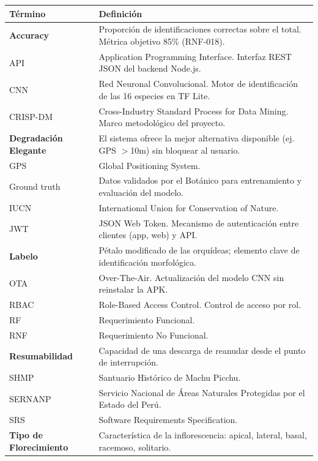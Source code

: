 \documentclass[12pt, a4paper]{article}
\begin{document}
\begin{longtable}{|p{3.2cm}|p{11.3cm}|}
\hline
\textbf{T\'ermino} & \textbf{Definici\'on} \\
\hline
\endhead
\textbf{Accuracy} & Proporci\'on de identificaciones correctas sobre el total. M\'etrica objetivo 85\% (RNF-018). \\
\hline
API & Application Programming Interface. Interfaz REST JSON del backend Node.js. \\
\hline
CNN & Red Neuronal Convolucional. Motor de identificaci\'on de las 16 especies en TF Lite. \\
\hline
CRISP-DM & Cross-Industry Standard Process for Data Mining. Marco metodol\'ogico del proyecto. \\
\hline
\textbf{Degradaci\'on Elegante} & El sistema ofrece la mejor alternativa disponible (ej. GPS $>$10m) sin bloquear al usuario. \\
\hline
GPS & Global Positioning System. \\
\hline
Ground truth & Datos validados por el Bot\'anico para entrenamiento y evaluaci\'on del modelo. \\
\hline
IUCN & International Union for Conservation of Nature. \\
\hline
JWT & JSON Web Token. Mecanismo de autenticaci\'on entre clientes (app, web) y API. \\
\hline
\textbf{Labelo} & P\'etalo modificado de las orqu\'ideas; elemento clave de identificaci\'on morfol\'ogica. \\
\hline
OTA & Over-The-Air. Actualizaci\'on del modelo CNN sin reinstalar la APK. \\
\hline
RBAC & Role-Based Access Control. Control de acceso por rol. \\
\hline
RF & Requerimiento Funcional. \\
\hline
RNF & Requerimiento No Funcional. \\
\hline
\textbf{Resumabilidad} & Capacidad de una descarga de reanudar desde el punto de interrupci\'on. \\
\hline
SHMP & Santuario Hist\'orico de Machu Picchu. \\
\hline
SERNANP & Servicio Nacional de \'Areas Naturales Protegidas por el Estado del Per\'u. \\
\hline
SRS & Software Requirements Specification. \\
\hline
\textbf{Tipo de Florecimiento} & Caracter\'istica de la inflorescencia: apical, lateral, basal, racemoso, solitario. \\

\end{longtable}
\end{document}

